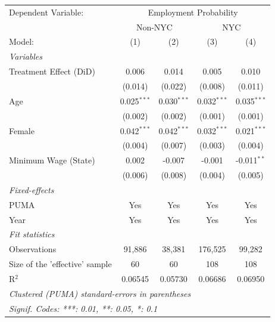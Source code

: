 
\begingroup
\centering
\begin{tabular}{lcccc}
   \tabularnewline \midrule \midrule
   Dependent Variable: & \multicolumn{4}{c}{Employment Probability}\\
    & \multicolumn{2}{c}{Non-NYC} & \multicolumn{2}{c}{NYC} \\ 
   Model:                         & (1)           & (2)           & (3)           & (4)\\  
   \midrule
   \emph{Variables}\\
   Treatment Effect (DiD)         & 0.006         & 0.014         & 0.005         & 0.010\\   
                                  & (0.014)       & (0.022)       & (0.008)       & (0.011)\\   
   Age                            & 0.025$^{***}$ & 0.030$^{***}$ & 0.032$^{***}$ & 0.035$^{***}$\\   
                                  & (0.002)       & (0.002)       & (0.001)       & (0.001)\\   
   Female                         & 0.042$^{***}$ & 0.042$^{***}$ & 0.032$^{***}$ & 0.021$^{***}$\\   
                                  & (0.004)       & (0.007)       & (0.003)       & (0.004)\\   
   Minimum Wage (State)           & 0.002         & -0.007        & -0.001        & -0.011$^{**}$\\   
                                  & (0.006)       & (0.008)       & (0.004)       & (0.005)\\   
   \midrule
   \emph{Fixed-effects}\\
   PUMA                           & Yes           & Yes           & Yes           & Yes\\  
   Year                           & Yes           & Yes           & Yes           & Yes\\  
   \midrule
   \emph{Fit statistics}\\
   Observations                   & 91,886        & 38,381        & 176,525       & 99,282\\  
   Size of the 'effective' sample & 60            & 60            & 108           & 108\\  
   R$^2$                          & 0.06545       & 0.05730       & 0.06686       & 0.06950\\  
   \midrule \midrule
   \multicolumn{5}{l}{\emph{Clustered (PUMA) standard-errors in parentheses}}\\
   \multicolumn{5}{l}{\emph{Signif. Codes: ***: 0.01, **: 0.05, *: 0.1}}\\
\end{tabular}
\par\endgroup


